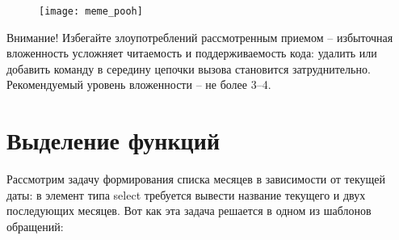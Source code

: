 \documentclass[../index.tex]{subfiles}
\begin{document}
\begin{figure}[h]
	\texttt{[image: meme\_pooh]}
	\centering
\end{figure}

Внимание! 
Избегайте злоупотреблений рассмотренным приемом -- избыточная вложенность усложняет читаемость и поддерживаемость кода: удалить или добавить команду в середину цепочки вызова становится затруднительно. Рекомендуемый уровень вложенности -- не более 3--4.
    
\section{Выделение функций}
    
Рассмотрим задачу формирования списка месяцев в зависимости от текущей даты: в элемент типа select требуется вывести название текущего и двух последующих месяцев. Вот как эта задача решается в одном из шаблонов обращений:
\end{document}
